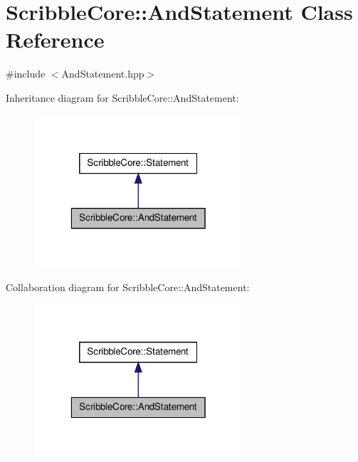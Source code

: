 \hypertarget{class_scribble_core_1_1_and_statement}{\section{Scribble\-Core\-:\-:And\-Statement Class Reference}
\label{class_scribble_core_1_1_and_statement}
}


{\ttfamily \#include $<$And\-Statement.\-hpp$>$}



Inheritance diagram for Scribble\-Core\-:\-:And\-Statement\-:
\nopagebreak
\begin{figure}[H]
\begin{center}
\leavevmode
\includegraphics[width=220pt]{class_scribble_core_1_1_and_statement__inherit__graph}
\end{center}
\end{figure}


Collaboration diagram for Scribble\-Core\-:\-:And\-Statement\-:
\nopagebreak
\begin{figure}[H]
\begin{center}
\leavevmode
\includegraphics[width=220pt]{class_scribble_core_1_1_and_statement__coll__graph}
\end{center}
\end{figure}
